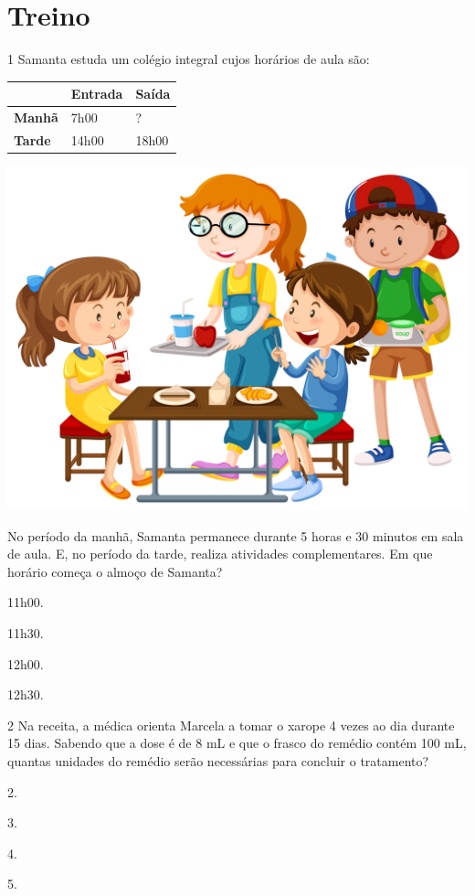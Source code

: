\section*{Treino}

\num{1} Samanta estuda um colégio integral cujos horários de aula são:  

\begin{longtable}[]{@{}lll@{}}
\toprule
& \textbf{Entrada} & \textbf{Saída}\tabularnewline
\midrule
\endhead
\textbf{Manhã} & 7h00 & ?\tabularnewline
\textbf{Tarde} & 14h00 & 18h00\tabularnewline
\bottomrule
\end{longtable}

\begin{center}
\includegraphics[width=.4\textwidth]{media/image24e.jpeg}
\end{center}

No período da manhã, Samanta permanece durante 5 horas e 30 minutos em sala de aula. 
E, no período da tarde, realiza atividades complementares.
Em que horário começa o almoço de Samanta?

\begin{multicols}{2}
\begin{escolha}
\item
  11h00.
\item
  11h30.
\item
  12h00.
\item
  12h30.
\end{escolha}
\end{multicols}

\num{2} Na receita, a médica orienta Marcela a tomar o xarope 4 vezes ao
dia durante 15 dias. Sabendo que a dose é de 8 mL e que o frasco do remédio
contém 100 mL, quantas unidades do remédio serão necessárias para concluir o 
tratamento? 

\begin{multicols}{2}
\begin{escolha}
\item
  2.
\item
  3.
\item
  4.
\item
  5.
\end{escolha}
\end{multicols}

